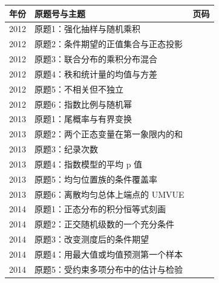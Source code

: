 \documentclass[UTF8,12pt,a4paper,fontset=fandol]{ctexbook}
\begin{document}
\begin{longtable}{@{}p{12mm}p{81mm}r@{}}\toprule 年份 & 原题号与主题 & 页码\\\midrule\endhead

2012 & 原题1：强化抽样与随机乘积 & \pageref{yau:2012-1}\\

2012 & 原题2：条件期望的正值集合与正态投影 & \pageref{yau:2012-2}\\

2012 & 原题3：联合分布的乘积分布混合 & \pageref{yau:2012-3}\\

2012 & 原题4：秩和统计量的均值与方差 & \pageref{yau:2012-4}\\

2012 & 原题5：不相关但不独立 & \pageref{yau:2012-5}\\

2012 & 原题6：指数比例与随机幂 & \pageref{yau:2012-6}\\

2013 & 原题1：尾概率与有界变换 & \pageref{yau:2013-1}\\

2013 & 原题2：两个正态变量在第一象限内的和 & \pageref{yau:2013-2}\\

2013 & 原题3：纪录次数 & \pageref{yau:2013-3}\\

2013 & 原题4：指数模型的平均 p 值 & \pageref{yau:2013-4}\\

2013 & 原题5：均匀位置族的条件覆盖率 & \pageref{yau:2013-5}\\

2013 & 原题6：离散均匀总体上端点的 UMVUE & \pageref{yau:2013-6}\\

2014 & 原题1：正态分布的积分恒等式刻画 & \pageref{yau:2014-1}\\

2014 & 原题2：正交随机级数的一个充分条件 & \pageref{yau:2014-2}\\

2014 & 原题3：改变测度后的条件期望 & \pageref{yau:2014-3}\\

2014 & 原题4：用最大值或均值预测第一个样本 & \pageref{yau:2014-4}\\

2014 & 原题5：受约束多项分布中的估计与检验 & \pageref{yau:2014-5}\\


\end{longtable}
\end{document}
